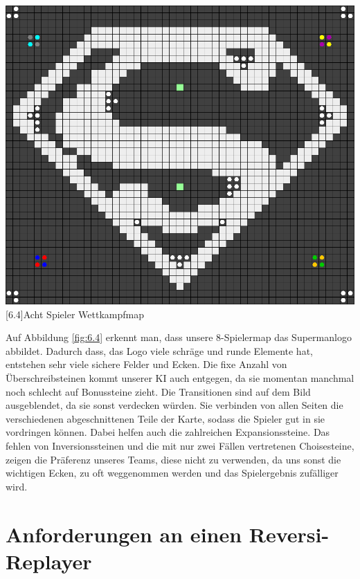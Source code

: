 \documentclass[12pt,a4paper,bibliography=totocnumbered,listof=totocnumbered]{scrartcl}
\begin{document}
		\vspace{1em}
	\begin{minipage}{\linewidth}
		\centering
		\includegraphics[width=0.66\linewidth]{pics/Kapitel_6/SupermanMap.png}
		[6.4]{Acht Spieler Wettkampfmap}
		\label{fig:6.4}
	\end{minipage}
	\vspace{1em}
	
	 Auf Abbildung \ref{fig:6.4} erkennt man, dass unsere 8-Spielermap das Supermanlogo abbildet. Dadurch dass, das Logo viele schräge und runde Elemente hat, entstehen sehr viele sichere Felder und Ecken. Die fixe Anzahl von Überschreibsteinen kommt unserer KI auch entgegen, da sie momentan manchmal noch schlecht auf Bonussteine zieht. Die Transitionen sind auf dem Bild ausgeblendet, da sie sonst verdecken würden. Sie verbinden von allen Seiten die verschiedenen abgeschnittenen Teile der Karte, sodass die Spieler gut in sie vordringen können. Dabei helfen auch die zahlreichen Expansionssteine. Das fehlen von Inversionssteinen und die mit nur zwei Fällen vertretenen Choisesteine, zeigen die Präferenz unseres Teams, diese nicht zu verwenden, da uns sonst die wichtigen Ecken, zu oft weggenommen werden und das Spielergebnis zufälliger wird.
	
	\section{Anforderungen an einen Reversi-Replayer}
	\vspace{1em}
	
\end{document}
